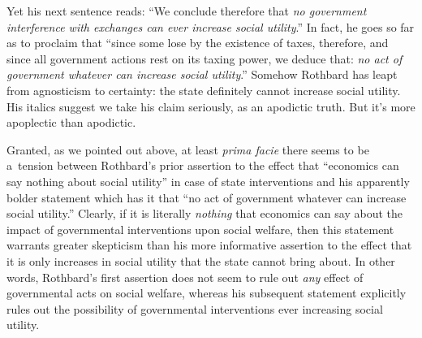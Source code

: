 Yet his next sentence reads: ``We conclude therefore that \textit{no government interference with exchanges can ever increase social utility}.'' In fact, he goes so far as to proclaim that ``since some lose by the existence of taxes, therefore, and since all government actions rest on its taxing power, we deduce that: \textit{no act of government whatever can increase social utility}.'' Somehow Rothbard has leapt from agnosticism to certainty: the state definitely cannot increase social utility. His italics suggest we take his claim seriously, as an apodictic truth. But it's more apoplectic than apodictic.



Granted, as we pointed out above, at least \textit{prima facie} there seems to be a~tension between Rothbard's prior assertion to the effect that ``economics can say nothing about social utility'' in case of state interventions and his apparently bolder statement which has it that ``no act of government whatever can increase social utility.'' Clearly, if it is literally \textit{nothing} that economics can say about the impact of governmental interventions upon social welfare, then this statement warrants greater skepticism than his more informative assertion to the effect that it is only increases in social utility that the state cannot bring about. In other words, Rothbard's first assertion does not seem to rule out \textit{any} effect of governmental acts on social welfare, whereas his subsequent statement explicitly rules out the possibility of governmental interventions ever increasing social utility.



